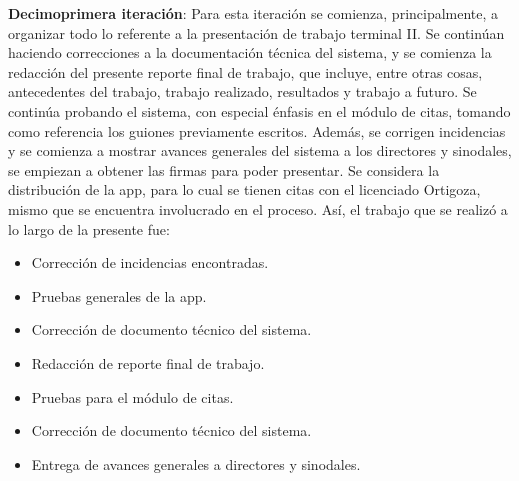 \noindent
\newline
\textbf{Decimoprimera iteración}: Para esta iteración se comienza, principalmente, a organizar todo lo referente a la presentación de trabajo terminal II. Se continúan haciendo correcciones a la documentación técnica del sistema, y se comienza la redacción del presente reporte final de trabajo, que incluye, entre otras cosas, antecedentes del trabajo, trabajo realizado, resultados y trabajo a futuro.
\newline
\newline
Se continúa probando el sistema, con especial énfasis en el módulo de citas, tomando como referencia los guiones previamente escritos. Además, se corrigen incidencias y se comienza a mostrar avances generales del sistema a los directores y sinodales, se empiezan a obtener las firmas para poder presentar. Se considera la distribución de la app, para lo cual se tienen citas con el licenciado Ortigoza, mismo que se encuentra involucrado en el proceso.  
\newline
Así, el trabajo que se realizó a lo largo de la presente fue:
\begin{itemize}
	\item Corrección de incidencias encontradas.
	\item Pruebas generales de la app. 
	\item Corrección de documento técnico del sistema.
	\item Redacción de reporte final de trabajo.
	\item Pruebas para el módulo de citas.
	\item Corrección de documento técnico del sistema.
	\item Entrega de avances generales a directores y sinodales.
\end{itemize}

